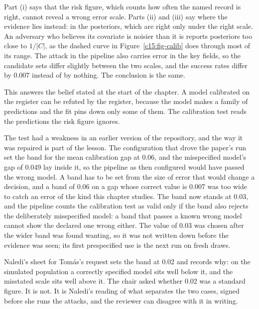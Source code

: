 Part (i) says that the risk figure, which counts how often the named record is
right, cannot reveal a wrong error scale. Parts (ii) and (iii) say where the
evidence lies instead: in the posteriors, which are right only under the right
scale. An adversary who believes its covariate is noisier than it is reports
posteriors too close to $1/|C|$, as the dashed curve in Figure~\ref{c15:fig-calib}
does through most of its range. The attack in the pipeline also carries error in
the key fields, so the candidate sets differ slightly between the two scales, and
the success rates differ by 0.007 instead of by nothing. The conclusion is the same.

This answers the belief stated at the start of the chapter. A model calibrated on
the register can be refuted by the register, because the model makes a family of
predictions and the fit pins down only some of them. The calibration test reads
the predictions the risk figure ignores.

The test had a weakness in an earlier version of the repository, and the way it was
repaired is part of the lesson. The configuration that drove the paper's run set the band
for the mean calibration gap at 0.06, and the misspecified model's gap of 0.049 lay inside
it, so the pipeline as then configured would have passed the wrong model. A band has to be
set from the size of error that would change a decision, and a band of 0.06 on a gap whose
correct value is 0.007 was too wide to catch an error of the kind this chapter studies. The
band now stands at 0.03, and the pipeline counts the calibration test as valid only if the
band also rejects the deliberately misspecified model: a band that passes a known wrong
model cannot show the declared one wrong either.
The value of 0.03 was chosen after the wider band was found wanting, so it was not written down
before the evidence was seen; its first prespecified use is the next run on fresh draws.

Naledi's sheet for Tomás's request sets the band at 0.02 and records why: on the
simulated population a correctly specified model sits well below it, and the
misstated scale sits well above it. The chair asked whether 0.02 was a standard
figure. It is not. It is Naledi's reading of what separates the two cases, signed
before she runs the attacks, and the reviewer can disagree with it in writing.


